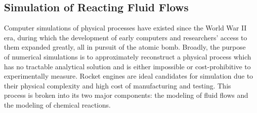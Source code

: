 \subsection{Simulation of Reacting Fluid Flows}

Computer simulations of physical processes have existed since the World War II era, during which the development of early computers and researchers' access to them expanded greatly, all in pursuit of the atomic bomb. Broadly, the purpose of numerical simulations is to approximately reconstruct a physical process which has no tractable analytical solution and is either impossible or cost-prohibitive to experimentally measure. Rocket engines are ideal candidates for simulation due to their physical complexity and high cost of manufacturing and testing. This process is broken into its two major components: the modeling of fluid flows and the modeling of chemical reactions.

